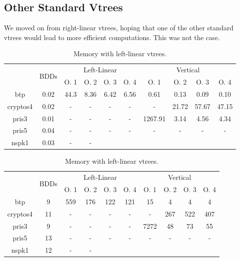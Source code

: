 \documentclass[11pt]{report}
\begin{document}
\subsection{Other Standard Vtrees}

We moved on from right-linear vtrees, hoping that one of the other standard vtrees would lead to more efficient computations. This was not the case. 


\begin{table}
\centering
\begin{tabular}{|*{10}{c|}}
\hline
\multirow{2}{*}{} & \multirow{2}{*}{BDDs} & \multicolumn{4}{c|}{Left-Linear} & \multicolumn{4}{c|}{Vertical}\\ \cline{3-10}
& & O. 1 & O. 2 & O. 3 & O. 4  & O. 1 & O. 2 & O. 3 & O. 4 \\ \hline
btp & 0.02& 44.3 & 8.36 & 6.42 & 6.56 & 0.61 & 0.13 & 0.09 & 0.10 \\ \hline
cryptos4 & 0.02 & - & - & - & - & - & 21.72 & 57.67 & 47.15 \\ \hline
pris3 & 0.01 & - & - & - & - & 1267.91 & 3.14 & 4.56 & 4.34 \\ \hline
pris5 & 0.04 &- &- &- &- & - &-  &- & -\\ \hline
nspk1 & 0.03 & - & - & & & & & & \\ \hline
\end{tabular}
\caption{Time Comparisons with left-linear vtrees.}
\label{table:otherstandardvtrees1time}
\vspace{0.5in}
\centering
\begin{tabular}{|*{10}{c|}}
\hline
\multirow{2}{*}{} & \multirow{2}{*}{BDDs} & \multicolumn{4}{c|}{Left-Linear} & \multicolumn{4}{c|}{Vertical}\\ \cline{3-10}
& & O. 1 & O. 2 & O. 3 & O. 4  & O. 1 & O. 2 & O. 3 & O. 4 \\ \hline
btp & 9 & 559 & 176 & 122 & 121 & 15 & 4 & 4 & 4 \\ \hline
cryptos4 & 11 & - & - & -& - & -  & 267 & 522 & 407 \\ \hline
pris3 & 9 & - & - & - & - & 7272 & 48 & 73 & 55 \\ \hline
pris5 & 13 & - &- &- &- &- &- &-&- \\ \hline
nspk1 & 12 & - &- & & & & & & \\ \hline
\end{tabular}
\caption{Memory with left-linear vtrees.}
\label{table:otherstandardvtrees1memory}
\end{table}
\end{document}

